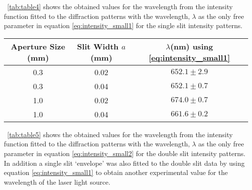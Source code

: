 \documentclass{article}
\newcommand{\tabref}[2][\tablename~]{#1\ref{#2}}
\begin{document}
\clearpage
\vspace{2mm}
\noindent
\tabref{tab:table4} shows the obtained values for the wavelength from the intensity function fitted to the diffraction patterns with the wavelength, $\lambda$ as the only free parameter in equation \eqref{eq:intensity_small1} for the single slit intensity patterns.

\vspace{5mm}
\begin{table*}[h]
\centering %
\caption{Table of experimental values for the wavelength, $\lambda$ of the laser light source by using a non-linear least squares fit to the data with equation \eqref{eq:intensity_small1} for the single slit intensity patterns.}
\label{tab:table4}
\begin{tabular}{|c|c|c|}
\hline
Aperture Size (mm) & Slit Width $a$(mm) & $\lambda$(nm) using \eqref{eq:intensity_small1} \\
\hline
0.3 & 0.02 & $652.1 \pm 2.9$ \\
\hline
0.3 & 0.04 & $652.1 \pm 0.7$ \\
\hline
1.0 & 0.02 & $674.0 \pm 0.7$ \\
\hline
1.0 & 0.04 & $661.6 \pm 0.2$ \\
\hline
\end{tabular}
\end{table*}

\vspace{2mm}
\noindent
\tabref{tab:table5} shows the obtained values for the wavelength from the intensity function fitted to the diffraction patterns with the wavelength, $\lambda$ as the only free parameter in equation \eqref{eq:intensity_small2} for the double slit intensity patterns. In addition a single slit `envelope' was also fitted to the double slit data by using equation \eqref{eq:intensity_small1} to obtain another experimental value for the wavelength of the laser light source.
\end{document}
